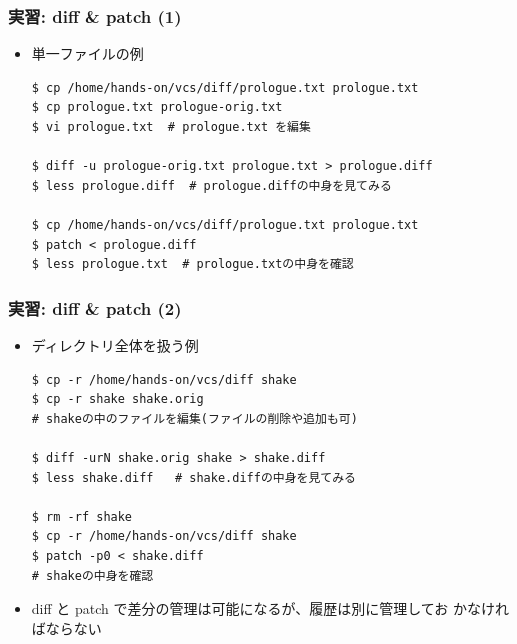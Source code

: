 \begin{frame}[t,fragile]
  \frametitle{実習: diff \& patch (1)}
  \begin{itemize}
  \item 単一ファイルの例
\begin{lstlisting}
$ cp /home/hands-on/vcs/diff/prologue.txt prologue.txt
$ cp prologue.txt prologue-orig.txt
$ vi prologue.txt  # prologue.txt を編集

$ diff -u prologue-orig.txt prologue.txt > prologue.diff
$ less prologue.diff  # prologue.diffの中身を見てみる
  
$ cp /home/hands-on/vcs/diff/prologue.txt prologue.txt
$ patch < prologue.diff
$ less prologue.txt  # prologue.txtの中身を確認
\end{lstlisting}
  \end{itemize}
\end{frame}

\begin{frame}[t,fragile]
  \frametitle{実習: diff \& patch (2)}
  \begin{itemize}
  \item ディレクトリ全体を扱う例
\begin{lstlisting}
$ cp -r /home/hands-on/vcs/diff shake
$ cp -r shake shake.orig
# shakeの中のファイルを編集(ファイルの削除や追加も可)

$ diff -urN shake.orig shake > shake.diff
$ less shake.diff   # shake.diffの中身を見てみる

$ rm -rf shake
$ cp -r /home/hands-on/vcs/diff shake
$ patch -p0 < shake.diff
# shakeの中身を確認
\end{lstlisting}
  \item diff と patch で差分の管理は可能になるが、履歴は別に管理してお
    かなければならない
  \end{itemize}
\end{frame}

